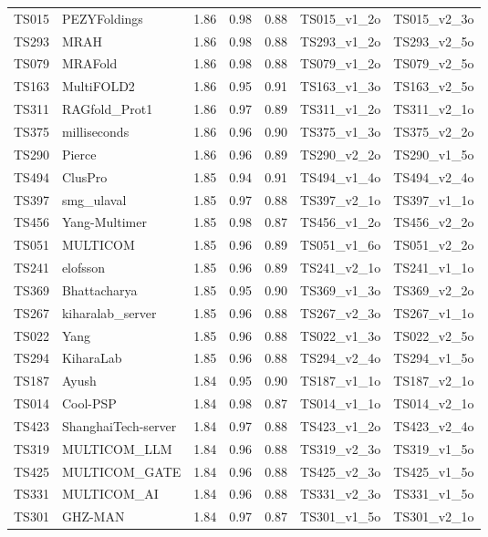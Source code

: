 \begin{longtable}{lllllll}
TS015 & PEZYFoldings & 1.86 & 0.98 & 0.88 & TS015\_v1\_2o & TS015\_v2\_3o \\ 
TS293 & MRAH & 1.86 & 0.98 & 0.88 & TS293\_v1\_2o & TS293\_v2\_5o \\ 
TS079 & MRAFold & 1.86 & 0.98 & 0.88 & TS079\_v1\_2o & TS079\_v2\_5o \\ 
TS163 & MultiFOLD2 & 1.86 & 0.95 & 0.91 & TS163\_v1\_3o & TS163\_v2\_5o \\ 
TS311 & RAGfold\_Prot1 & 1.86 & 0.97 & 0.89 & TS311\_v1\_2o & TS311\_v2\_1o \\ 
TS375 & milliseconds & 1.86 & 0.96 & 0.90 & TS375\_v1\_3o & TS375\_v2\_2o \\ 
TS290 & Pierce & 1.86 & 0.96 & 0.89 & TS290\_v2\_2o & TS290\_v1\_5o \\ 
TS494 & ClusPro & 1.85 & 0.94 & 0.91 & TS494\_v1\_4o & TS494\_v2\_4o \\ 
TS397 & smg\_ulaval & 1.85 & 0.97 & 0.88 & TS397\_v2\_1o & TS397\_v1\_1o \\ 
TS456 & Yang-Multimer & 1.85 & 0.98 & 0.87 & TS456\_v1\_2o & TS456\_v2\_2o \\ 
TS051 & MULTICOM & 1.85 & 0.96 & 0.89 & TS051\_v1\_6o & TS051\_v2\_2o \\ 
TS241 & elofsson & 1.85 & 0.96 & 0.89 & TS241\_v2\_1o & TS241\_v1\_1o \\ 
TS369 & Bhattacharya & 1.85 & 0.95 & 0.90 & TS369\_v1\_3o & TS369\_v2\_2o \\ 
TS267 & kiharalab\_server & 1.85 & 0.96 & 0.88 & TS267\_v2\_3o & TS267\_v1\_1o \\ 
TS022 & Yang & 1.85 & 0.96 & 0.88 & TS022\_v1\_3o & TS022\_v2\_5o \\ 
TS294 & KiharaLab & 1.85 & 0.96 & 0.88 & TS294\_v2\_4o & TS294\_v1\_5o \\ 
TS187 & Ayush & 1.84 & 0.95 & 0.90 & TS187\_v1\_1o & TS187\_v2\_1o \\ 
TS014 & Cool-PSP & 1.84 & 0.98 & 0.87 & TS014\_v1\_1o & TS014\_v2\_1o \\ 
TS423 & ShanghaiTech-server & 1.84 & 0.97 & 0.88 & TS423\_v1\_2o & TS423\_v2\_4o \\ 
TS319 & MULTICOM\_LLM & 1.84 & 0.96 & 0.88 & TS319\_v2\_3o & TS319\_v1\_5o \\ 
TS425 & MULTICOM\_GATE & 1.84 & 0.96 & 0.88 & TS425\_v2\_3o & TS425\_v1\_5o \\ 
TS331 & MULTICOM\_AI & 1.84 & 0.96 & 0.88 & TS331\_v2\_3o & TS331\_v1\_5o \\ 
TS301 & GHZ-MAN & 1.84 & 0.97 & 0.87 & TS301\_v1\_5o & TS301\_v2\_1o \\ 

\end{longtable}
